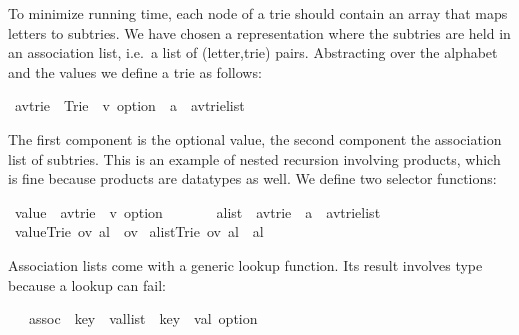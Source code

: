 %
\begin{isabellebody}%
\def\isabellecontext{Trie}%
%
\begin{isamarkuptext}%
To minimize running time, each node of a trie should contain an array that maps
letters to subtries. We have chosen a
representation where the subtries are held in an association list, i.e.\ a
list of (letter,trie) pairs.  Abstracting over the alphabet  and the
values  we define a trie as follows:%
\end{isamarkuptext}%
\ {\isacharparenleft}{\isacharprime}a{\isacharcomma}{\isacharprime}v{\isacharparenright}trie\ {\isacharequal}\ Trie\ \ {\isachardoublequote}{\isacharprime}v\ option{\isachardoublequote}\ \ {\isachardoublequote}{\isacharparenleft}{\isacharprime}a\ {\isacharasterisk}\ {\isacharparenleft}{\isacharprime}a{\isacharcomma}{\isacharprime}v{\isacharparenright}trie{\isacharparenright}list{\isachardoublequote}%
\begin{isamarkuptext}%
\noindent
The first component is the optional value, the second component the
association list of subtries.  This is an example of nested recursion involving products,
which is fine because products are datatypes as well.
We define two selector functions:%
\end{isamarkuptext}%
\ value\ {\isacharcolon}{\isacharcolon}\ {\isachardoublequote}{\isacharparenleft}{\isacharprime}a{\isacharcomma}{\isacharprime}v{\isacharparenright}trie\ {\isasymRightarrow}\ {\isacharprime}v\ option{\isachardoublequote}\isanewline
\ \ \ \ \ \ \ alist\ {\isacharcolon}{\isacharcolon}\ {\isachardoublequote}{\isacharparenleft}{\isacharprime}a{\isacharcomma}{\isacharprime}v{\isacharparenright}trie\ {\isasymRightarrow}\ {\isacharparenleft}{\isacharprime}a\ {\isacharasterisk}\ {\isacharparenleft}{\isacharprime}a{\isacharcomma}{\isacharprime}v{\isacharparenright}trie{\isacharparenright}list{\isachardoublequote}\isanewline
{}\ {\isachardoublequote}value{\isacharparenleft}Trie\ ov\ al{\isacharparenright}\ {\isacharequal}\ ov{\isachardoublequote}\isanewline
{}\ {\isachardoublequote}alist{\isacharparenleft}Trie\ ov\ al{\isacharparenright}\ {\isacharequal}\ al{\isachardoublequote}%
\begin{isamarkuptext}%
\noindent
Association lists come with a generic lookup function.  Its result
involves type  because a lookup can fail:%
\end{isamarkuptext}%
\ \ \ assoc\ {\isacharcolon}{\isacharcolon}\ {\isachardoublequote}{\isacharparenleft}{\isacharprime}key\ {\isacharasterisk}\ {\isacharprime}val{\isacharparenright}list\ {\isasymRightarrow}\ {\isacharprime}key\ {\isasymRightarrow}\ {\isacharprime}val\ option{\isachardoublequote}\isanewline

\end{isabellebody}
